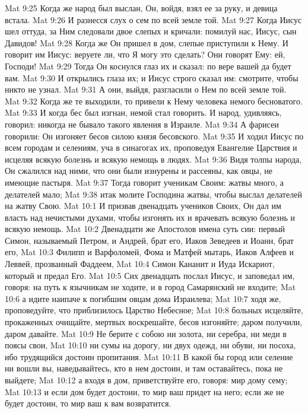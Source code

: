 \vs Mat 9:25 Когда же народ был выслан, Он, войдя, взял ее за руку, и девица встала.
\vs Mat 9:26 И разнесся слух о сем по всей земле той.
\rsbpar\vs Mat 9:27 Когда Иисус шел оттуда, за Ним следовали двое слепых и кричали: помилуй нас, Иисус, сын Давидов!
\vs Mat 9:28 Когда же Он пришел в дом, слепые приступили к Нему. И говорит им Иисус: веруете ли, что Я могу это сделать? Они говорят Ему: ей, Господи!
\vs Mat 9:29 Тогда Он коснулся глаз их и сказал: по вере вашей да будет вам.
\vs Mat 9:30 И открылись глаза их; и Иисус строго сказал им: смотрите, чтобы никто не узнал.
\vs Mat 9:31 А они, выйдя, разгласили о Нем по всей земле той.
\rsbpar\vs Mat 9:32 Когда же те выходили, то привели к Нему человека немого бесноватого.
\vs Mat 9:33 И когда бес был изгнан, немой стал говорить. И народ, удивляясь, говорил: никогда не бывало такого явления в Израиле.
\vs Mat 9:34 А фарисеи говорили: Он изгоняет бесов силою князя бесовского.
\rsbpar\vs Mat 9:35 И ходил Иисус по всем городам и селениям, уча в синагогах их, проповедуя Евангелие Царствия и исцеляя всякую болезнь и всякую немощь в людях.
\vs Mat 9:36 Видя толпы народа, Он сжалился над ними, что они были изнурены и рассеяны, как овцы, не имеющие пастыря.
\vs Mat 9:37 Тогда говорит ученикам Своим: жатвы много, а делателей мало;
\vs Mat 9:38 итак молите Господина жатвы, чтобы выслал делателей на жатву Свою.
\vs Mat 10:1 И призвав двенадцать учеников Своих, Он дал им власть над нечистыми духами, чтобы изгонять их и врачевать всякую болезнь и всякую немощь.
\vs Mat 10:2 Двенадцати же Апостолов имена суть сии: первый Симон, называемый Петром, и Андрей, брат его, Иаков Зеведеев и Иоанн, брат его,
\vs Mat 10:3 Филипп и Варфоломей, Фома и Матфей мытарь, Иаков Алфеев и Леввей, прозванный Фаддеем,
\vs Mat 10:4 Симон Кананит и Иуда Искариот, который и предал Его.
\vs Mat 10:5 Сих двенадцать послал Иисус, и заповедал им, говоря: на путь к язычникам не ходите, и в город Самарянский не входите;
\vs Mat 10:6 а идите наипаче к погибшим овцам дома Израилева;
\vs Mat 10:7 ходя же, проповедуйте, что приблизилось Царство Небесное;
\vs Mat 10:8 больных исцеляйте, прокаженных очищайте, мертвых воскрешайте, бесов изгоняйте; даром получили, даром давайте.
\vs Mat 10:9 Не берите с собою ни золота, ни серебра, ни меди в поясы свои,
\vs Mat 10:10 ни сумы на дорогу, ни двух одежд, ни обуви, ни посоха, ибо трудящийся достоин пропитания.
\vs Mat 10:11 В какой бы город или селение ни вошли вы, наведывайтесь, кто в нем достоин, и там оставайтесь, пока не выйдете;
\vs Mat 10:12 а входя в дом, приветствуйте его, говоря: мир дому сему;
\vs Mat 10:13 и если дом будет достоин, то мир ваш придет на него; если же не будет достоин, то мир ваш к вам возвратится.
